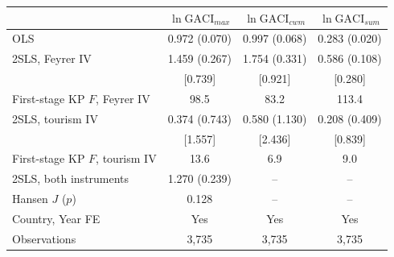 \begin{tabular}{lccc}
\toprule
 & $\ln\mathrm{GACI}_{max}$ & $\ln\mathrm{GACI}_{cwm}$ & $\ln\mathrm{GACI}_{sum}$ \\
\midrule
OLS & 0.972\sym{***} (0.070) & 0.997\sym{***} (0.068) & 0.283\sym{***} (0.020) \\
2SLS, Feyrer IV & 1.459\sym{***} (0.267) & 1.754\sym{***} (0.331) & 0.586\sym{***} (0.108) \\
 & [0.739]\sym{**} & [0.921]\sym{*} & [0.280]\sym{**} \\
First-stage KP $F$, Feyrer IV & 98.5 & 83.2 & 113.4 \\
2SLS, tourism IV & 0.374 (0.743) & 0.580 (1.130) & 0.208 (0.409) \\
 & [1.557] & [2.436] & [0.839] \\
First-stage KP $F$, tourism IV & 13.6 & 6.9 & 9.0 \\
2SLS, both instruments & 1.270\sym{***} (0.239) & -- & -- \\
Hansen $J$ ($p$) & 0.128 & -- & -- \\
\midrule
Country, Year FE & Yes & Yes & Yes \\
Observations & 3,735 & 3,735 & 3,735 \\
\bottomrule
\end{tabular}